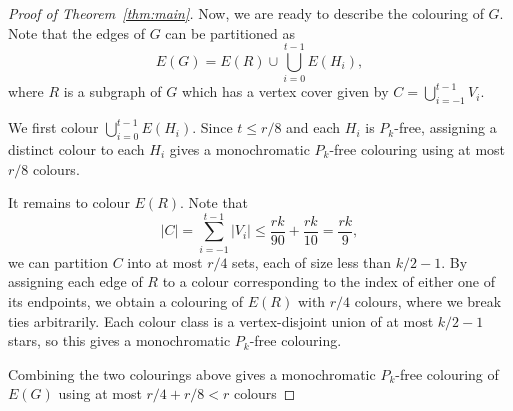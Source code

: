 \documentclass[10pt,a4paper]{amsart}
\renewcommand{\le}{\leqslant}
\renewcommand{\leq}{\le}
\begin{document}
\begin{proof}[Proof of Theorem~\ref{thm:main}]
Now, we are ready to describe the colouring of $G$. Note that the edges of $G$ can be partitioned as
\[E(G)=E(R)\cup\bigcup_{i=0}^{t-1}E(H_i),\]
where $R$ is a subgraph of $G$ which has a vertex cover given by $C=\bigcup_{i=-1}^{t-1}V_i$.


We first colour $\bigcup_{i=0}^{t-1}E(H_i)$. Since $t\leq r/8$ and each $H_i$ is $P_k$-free, assigning a distinct colour to each $H_i$ gives a monochromatic $P_k$-free colouring using at most $r/8$ colours.

It remains to colour $E(R)$. Note that \[|C|=\sum_{i=-1}^{t-1}|V_i|\leq \frac{rk}{90}+\frac{rk}{10}=\frac{rk}{9},\] we can partition $C$ into at most $r/4$ sets, each of size less than $k/2-1$. By assigning each edge of $R$ to a colour corresponding to the index of either one of its endpoints, we obtain a colouring of $E(R)$ with $r/4$ colours, where we break ties arbitrarily. Each colour class is a vertex-disjoint union of at most $k/2-1$ stars, so this gives a monochromatic $P_k$-free colouring.

Combining the two colourings above gives a monochromatic $P_k$-free colouring of $E(G)$
using at most $r/4+r/8<r$ colours
\end{proof}
\end{document}
